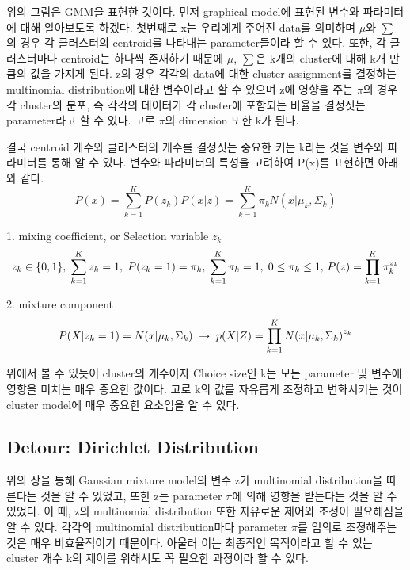 \documentclass[a4paper]{oblivoir}
\begin{document}
위의 그림은 GMM을 표현한 것이다. 먼저 graphical model에 표현된 변수와 파라미터에 대해 알아보도록 하겠다. 첫번째로 x는 우리에게 주어진 data를 의미하며 $\mu$와 $\sum$의 경우 각 클러스터의 centroid를 나타내는 parameter들이라 할 수 있다. 또한, 각 클러스터마다 centroid는 하나씩 존재하기 때문에 $\mu$, $\sum$은 k개의 cluster에 대해 k개 만큼의 값을 가지게 된다. z의 경우 각각의 data에 대한 cluster assignment를 결정하는 multinomial distribution에 대한 변수이라고 할 수 있으며 z에 영향을 주는 $\pi$의 경우 각  cluster의 분포, 즉 각각의 데이터가 각 cluster에 포함되는 비율을 결정짓는 parameter라고 할 수 있다. 고로 $\pi$의 dimension 또한 k가 된다. 

결국 centroid 개수와 클러스터의 개수를 결정짓는 중요한 키는 k라는 것을 변수와 파라미터를 통해 알 수 있다. 변수와 파라미터의 특성을 고려하여 P(x)를 표현하면 아래와 같다. 
\begin{equation}
P(x) = \sum^{K}_{k=1}P(z_{k})P(x|z) =
\sum^{K}_{k=1}\pi_{k}N(x|\mu_{k},{\Sigma}_{k})
\label{eq:13-2-1}
\end{equation}

1. mixing coefficient, or Selection variable $z_{k}$
\begin{equation}
z_{k} \in \{0,1\}, \; \sum^{K}_{k=1}z_{k} = 1, \; P(z_{k}=1) = \pi_{k}, \; \sum^{K}_{k=1}\pi_{k} = 1, \; 0 \leq \pi_{k} \leq 1, \,
P(z) = \prod^{K}_{k=1}\pi^{z_{k}}_{k} \nonumber \\
\end{equation}

2. mixture component
\begin{equation}
P(X|z_{k}=1) = N(x|\mu_{k},\Sigma _{k})\; \rightarrow \; p(X|Z) = \prod^{K}_{k=1}N{(x|\mu_{k},{\Sigma}_{k})}^{z_{k}}\nonumber \\
\end{equation}

위에서 볼 수 있듯이 cluster의 개수이자 Choice size인 k는 모든 parameter 및 변수에 영향을 미치는 매우 중요한 값이다. 고로 k의 값를 자유롭게 조정하고 변화시키는 것이 cluster model에 매우 중요한 요소임을 알 수 있다.

\subsection{Detour: Dirichlet Distribution}
위의 장을 통해 Gaussian mixture model의 변수 z가 multinomial distribution을 따른다는 것을 알 수 있었고, 또한 z는 parameter $\pi$에 의해 영향을 받는다는 것을 알 수 있었다. 이 때, z의 multinomial distribution 또한 자유로운 제어와 조정이 필요해짐을 알 수 있다.  각각의 multinomial distribution마다 parameter $\pi$를 임의로 조정해주는 것은 매우 비효율적이기 때문이다. 아울러 이는 최종적인 목적이라고 할 수 있는 cluster 개수 k의 제어를 위해서도 꼭 필요한 과정이라 할 수 있다.
\end{document}
